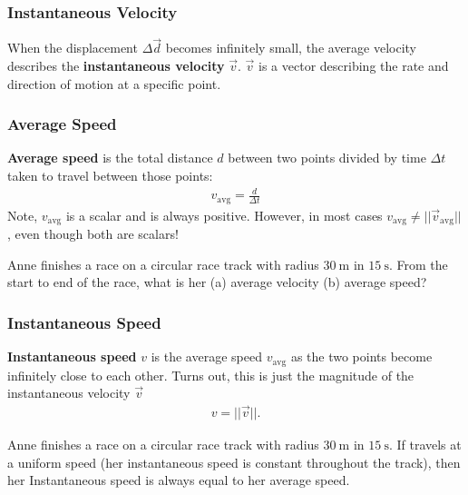 \documentclass[20pt]{beamer}
\begin{document}
\begin{frame}
	\frametitle{Instantaneous Velocity}
	\begin{figure}[ht]
		\centering
		\label{fig:instantaneousvelocity}
	\end{figure}
	\begin{definition}
		When the displacement $\Delta \vec{d}$ becomes infinitely small, the average velocity describes the \textbf{instantaneous velocity} $\vec{v}$. $\vec{v}$ is a vector describing the rate and direction of motion at a specific point.
	\end{definition}
\end{frame}

\begin{frame}
	\frametitle{Average Speed}
	\begin{definition}
		\textbf{Average speed} is the total distance $d$ between two points divided by time $\Delta t$ taken to travel between those points:
		\begin{align*}
			v_\mathrm{avg} = \frac{d}{\Delta t}
		\end{align*}
		Note, $v_\mathrm{avg}$ is a scalar and is always positive. However, in most cases $v_\mathrm{avg} \neq ||\vec{v}_\mathrm{avg}||$, even though both are scalars!
	\end{definition}

	\begin{example}
		Anne finishes a race on a circular race track with radius $\SI{30}{\meter}$ in $\SI{15}{\second}$. From the start to end of the race, what is her (a) average velocity (b) average speed?
	\end{example}
\end{frame}

\begin{frame}
	\frametitle{Instantaneous Speed}
	\begin{definition}
		\textbf{Instantaneous speed} $v$ is the average speed $v_\mathrm{avg}$ as the two points become infinitely close to each other. Turns out, this is just the magnitude of the instantaneous velocity $\vec{v}$
		\begin{align*}
			v = ||\vec{v}||.
		\end{align*}
	\end{definition}
	\begin{figure}[ht]
		\centering
		\label{fig:instantaneousspeed}
	\end{figure}
	\begin{example}
		Anne finishes a race on a circular race track with radius $\SI{30}{\meter}$ in $\SI{15}{\second}$. If travels at a uniform speed (her instantaneous speed is constant throughout the track), then her Instantaneous speed is always equal to her average speed.
	\end{example}
\end{frame}
\end{document}
